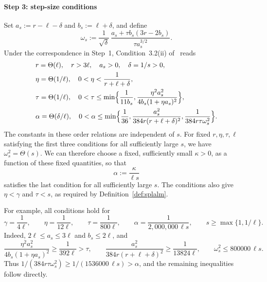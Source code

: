 \paragraph{Step 3: step-size conditions}
Set \(a_s:=r-\ell-\delta\) and \(b_s:=\ell+\delta\), and define
\[
\omega_s:=\frac1{\sqrt\delta}\,
\frac{a_s+\tau b_s(3r-2b_s)}{\tau a_s^{3/2}}.
\]
Under the correspondence in Step~1, Condition~3.2(ii)
of~\cite{li2026smoothing} reads
\begin{equation}
\begin{aligned}
&r=\Theta(\ell),\quad r>3\ell,\quad a_s>0,\quad \delta=1/s>0,\\
&\eta=\Theta(1/\ell),\quad 0<\eta<\frac1{r+\ell+\delta},\\
&\tau=\Theta(1/\ell),\quad
0<\tau\le\min\Bigl\{\frac1{11b_s},
\frac{\eta^2a_s^2}{4b_s(1+\eta a_s)^2}\Bigr\},\\
&\alpha=\Theta(\delta/\ell),\quad
0<\alpha\le\min\Bigl\{\frac1{36},
\frac{a_s^2}{384r(r+\ell+\delta)^2},
\frac1{384r\tau\omega_s^2}\Bigr\}.
\end{aligned}
\label{eq:beta0-stepsizes}
\end{equation}
The constants in these order relations are independent of \(s\).
For fixed \(r,\eta,\tau,\ell\) satisfying the first three conditions for
all sufficiently large \(s\), we have \(\omega_s^2=\Theta(s)\).
We can therefore choose a fixed, sufficiently small \(\kappa>0\), as a
function of these fixed quantities, so that
\begin{equation}
\alpha:=\frac\kappa{\ell s}
\label{eq:beta0-alpha}
\end{equation}
satisfies the last condition for all sufficiently large \(s\).
The conditions also give \(\eta<\gamma\) and \(\tau<s\), as required
by Definition~\ref{def:splalm}.

For example, all conditions hold for
\[
\gamma=\frac1{4\ell},\qquad \eta=\frac1{12\ell},\qquad
\tau=\frac1{800\ell},\qquad
\alpha=\frac1{2{,}000{,}000\,\ell s},\qquad
s\ge\max\{1,1/\ell\}.
\]
Indeed, \(2\ell\le a_s\le3\ell\) and \(b_s\le2\ell\), and
\[
\frac{\eta^2a_s^2}{4b_s(1+\eta a_s)^2}
\ge\frac1{392\ell}>\tau,\qquad
\frac{a_s^2}{384r(r+\ell+\delta)^2}\ge\frac1{13824\ell},
\qquad \omega_s^2\le800000\,\ell s.
\]
Thus \(1/(384r\tau\omega_s^2)\ge1/(1536000\,\ell s)>\alpha\),
and the remaining inequalities follow directly.

